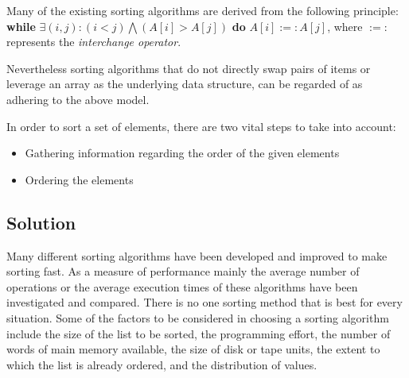 \documentclass[11pt, letter paper]{article}
\begin{document}
    Many of the existing sorting algorithms are derived from the following principle: \textbf{while} $\exists(i, j):(i < j) \bigwedge (A[i] > A[j])$ \textbf{do} $A[i] :=: A[j]$, where $:=:$ represents the \emph{interchange operator}.

    Nevertheless sorting algorithms that do not directly swap pairs of items or leverage an array as the underlying data structure, can be regarded of as adhering to the above model.

    In order to sort a set of elements, there are two vital steps to take into account:
    \begin{itemize}
        \item Gathering information regarding the order of the given elements
        \item Ordering the elements
    \end{itemize}
    
    \subsection{Solution}
    \label{sec:algsSorting}
    \cite{review} Many different sorting algorithms have been developed and improved to make sorting fast. As a measure of performance mainly the average 
    number of operations or the average execution times of these algorithms have been investigated 
    and compared. There is no one sorting method that is best for every situation. Some of 
    the factors to be considered in choosing a sorting algorithm include the size of the list to be 
    sorted, the programming effort, the number of words of main memory available, the size of disk or 
    tape units, the extent to which the list is already ordered, and the distribution of values. 
    
\end{document}
